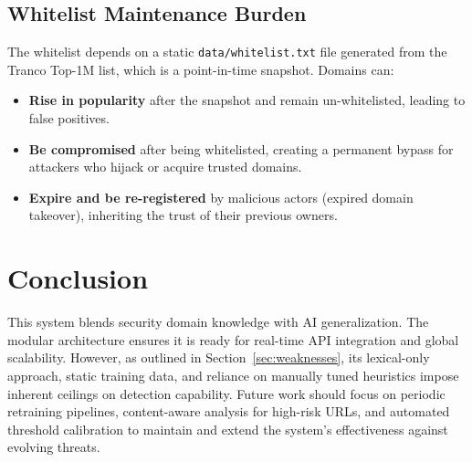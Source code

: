 \documentclass[12pt,a4paper]{article}
\begin{document}
\subsection{Whitelist Maintenance Burden}

The whitelist depends on a static \texttt{data/whitelist.txt} file generated from the Tranco Top-1M list, which is a point-in-time snapshot. Domains can:
\begin{itemize}
    \item \textbf{Rise in popularity} after the snapshot and remain un-whitelisted, leading to false positives.
    \item \textbf{Be compromised} after being whitelisted, creating a permanent bypass for attackers who hijack or acquire trusted domains.
    \item \textbf{Expire and be re-registered} by malicious actors (expired domain takeover), inheriting the trust of their previous owners.
\end{itemize}

\section{Conclusion}

This system blends security domain knowledge with AI generalization. The modular architecture ensures it is ready for real-time API integration and global scalability. However, as outlined in Section~\ref{sec:weaknesses}, its lexical-only approach, static training data, and reliance on manually tuned heuristics impose inherent ceilings on detection capability. Future work should focus on periodic retraining pipelines, content-aware analysis for high-risk URLs, and automated threshold calibration to maintain and extend the system's effectiveness against evolving threats.
\end{document}
